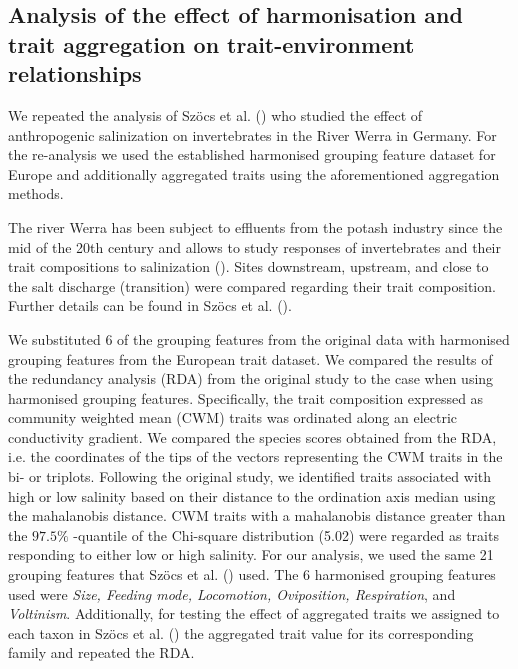 \documentclass{article}
\begin{document}
\subsection*{Analysis of the effect of harmonisation and trait aggregation on trait-environment relationships}

We repeated the analysis of Szöcs et al. (\cite{szocs_effects_2014}) who studied the effect of anthropogenic salinization on invertebrates in the River Werra in Germany. For the re-analysis we used the established harmonised grouping feature dataset for Europe and additionally aggregated traits using the aforementioned aggregation methods. 

The river Werra has been subject to effluents from the potash industry since the mid of the 20th century and allows to study responses of invertebrates and their trait compositions to salinization (\cite{bathe_biological_2011}). Sites downstream, upstream, and close to the salt discharge (transition) were compared regarding their trait composition. Further details can be found in Szöcs et al. (\cite{szocs_effects_2014}). 

We substituted 6 of the grouping features from the original data with harmonised grouping features from the European trait dataset. We compared the results of the redundancy analysis (RDA) from the original study to the case when using harmonised grouping features. Specifically, the trait composition expressed as community weighted mean (CWM) traits was ordinated along an electric conductivity gradient. We compared the species scores obtained from the RDA, i.e. the coordinates of the tips of the vectors representing the CWM traits in the bi- or triplots. Following the original study, we identified traits associated with high or low salinity based on their distance to the ordination axis median using the mahalanobis distance. CWM traits with a mahalanobis distance greater than the $97.5 \%$ -quantile of the Chi-square distribution (5.02) were regarded as traits responding to either low or high salinity. For our analysis, we used the same 21 grouping features that Szöcs et al. (\cite{szocs_effects_2014}) used. The 6 harmonised grouping features used were \textit{Size, Feeding mode, Locomotion, Oviposition, Respiration}, and \textit{Voltinism}. Additionally, for testing the effect of aggregated traits we assigned to each taxon in Szöcs et al. (\cite{szocs_effects_2014}) the aggregated trait value for its corresponding family and repeated the RDA.  

\end{document}
